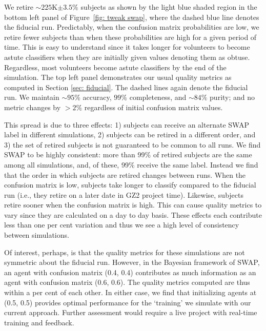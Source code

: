 We retire $\sim$$225$K$\pm3.5\%$ subjects as shown by the light blue shaded region in the bottom left panel of Figure~\ref{fig: tweak swap}, where the dashed blue line denotes the fiducial run. Predictably, when the confusion matrix probabilities are low, we retire fewer subjects than when these probabilities are high for a given period of time. This is easy to understand since it takes longer for volunteers to become astute classifiers when they are initially given values denoting them as obtuse. Regardless, most volunteers become astute classifiers by the end of the simulation. The top left panel demonstrates our usual quality metrics as computed in Section \ref{sec: fiducial}. The dashed lines again denote the fiducial run. We maintain $\sim$$95\%$ accuracy, $99\%$ completeness, and $\sim$$84\%$ purity;  and no metric changes by $> 2\%$ regardless of initial confusion matrix values.  
 
This spread is due to three effects: 
1) subjects can receive an alternate SWAP label in different simulations, 
2) subjects can be retired in a different order, and 
3) the set of retired subjects is not guaranteed to be common to all runs. 
We find SWAP to be highly consistent: more than 99\% of retired subjects are the same among all simulations, and, of these, 99\% receive the same label.  Instead we find that the order in which subjects are retired changes between runs. When the confusion matrix is low, subjects take longer to classify compared to the fiducial run (i.e., they retire on a later date in GZ2 project time). Likewise, subjects retire sooner when the confusion matrix is high. This can cause quality metrics to vary since they are calculated on a day to day basis. These effects each contribute less than one per cent variation and thus we see a high level of consistency between simulations. 

Of interest, perhaps, is that the quality metrics for these simulations are not symmetric about the fiducial run. However, in the Bayesian framework of SWAP, an agent with confusion matrix (0.4, 0.4) contributes as much information as an agent with confusion matrix (0.6, 0.6). The quality metrics computed are thus within a per cent of each other. In either case, we find that initializing agents at (0.5, 0.5) provides optimal performance for the `training' we simulate with our current approach. Further assessment would require a live project with real-time training and feedback. 


